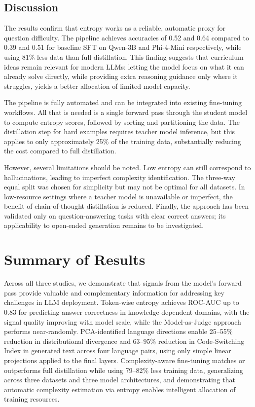 \subsection{Discussion}

The results confirm that entropy works as a reliable, automatic proxy for question difficulty. The pipeline achieves accuracies of 0.52 and 0.64 compared to 0.39 and 0.51 for baseline SFT on Qwen-3B and Phi-4-Mini respectively, while using 81\% less data than full distillation. This finding suggests that curriculum ideas remain relevant for modern LLMs: letting the model focus on what it can already solve directly, while providing extra reasoning guidance only where it struggles, yields a better allocation of limited model capacity.

The pipeline is fully automated and can be integrated into existing fine-tuning workflows. All that is needed is a single forward pass through the student model to compute entropy scores, followed by sorting and partitioning the data. The distillation step for hard examples requires teacher model inference, but this applies to only approximately 25\% of the training data, substantially reducing the cost compared to full distillation.

However, several limitations should be noted. Low entropy can still correspond to hallucinations, leading to imperfect complexity identification. The three-way equal split was chosen for simplicity but may not be optimal for all datasets. In low-resource settings where a teacher model is unavailable or imperfect, the benefit of chain-of-thought distillation is reduced. Finally, the approach has been validated only on question-answering tasks with clear correct answers; its applicability to open-ended generation remains to be investigated.

\section{Summary of Results}

Across all three studies, we demonstrate that signals from the model's forward pass provide valuable and complementary information for addressing key challenges in LLM deployment. Token-wise entropy achieves ROC-AUC up to 0.83 for predicting answer correctness in knowledge-dependent domains, with the signal quality improving with model scale, while the Model-as-Judge approach performs near-randomly. PCA-identified language directions enable 25--55\% reduction in distributional divergence and 63--95\% reduction in Code-Switching Index in generated text across four language pairs, using only simple linear projections applied to the final layers. Complexity-aware fine-tuning matches or outperforms full distillation while using 79--82\% less training data, generalizing across three datasets and three model architectures, and demonstrating that automatic complexity estimation via entropy enables intelligent allocation of training resources.

